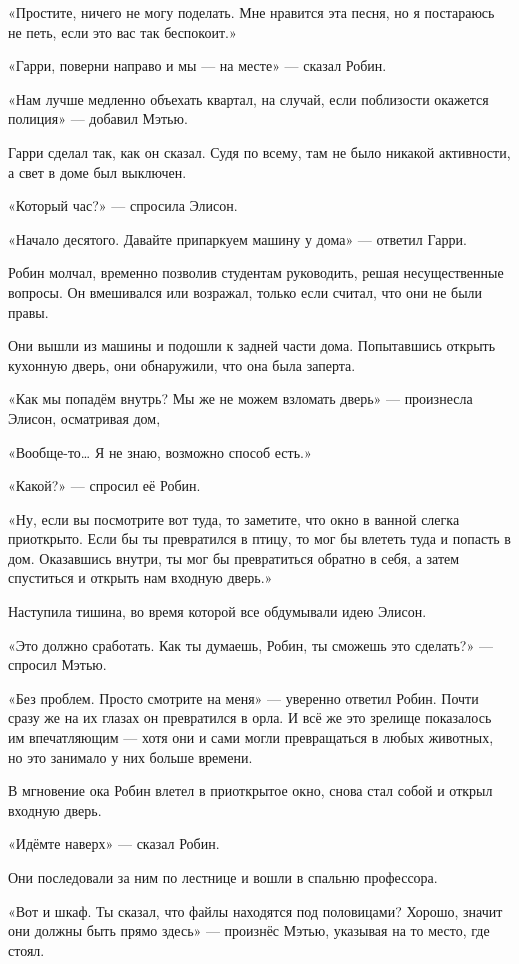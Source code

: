 \documentclass[a5paper, 9pt,
final, openany, twoside=true]{memoir}
\begin{document}
«Простите, ничего не могу поделать. Мне нравится эта песня, но я постараюсь не петь, если это вас так беспокоит.»

«Гарри, поверни направо и мы — на месте» — сказал Робин.

«Нам лучше медленно объехать квартал, на случай, если поблизости окажется полиция» — добавил Мэтью.

Гарри сделал так, как он сказал. Судя по всему, там не было никакой активности, а свет в доме был выключен.

«Который час?» — спросила Элисон.

«Начало десятого. Давайте припаркуем машину у дома» — ответил Гарри.

Робин молчал, временно позволив студентам руководить, решая несущественные вопросы. Он вмешивался или возражал, только если считал, что они не были правы.

Они вышли из машины и подошли к задней части дома. Попытавшись открыть кухонную дверь, они обнаружили, что она была заперта.

«Как мы попадём внутрь? Мы же не можем взломать дверь» — произнесла Элисон, осматривая дом,

«Вообще-то… Я не знаю, возможно способ есть.»

«Какой?» — спросил её Робин.

«Ну, если вы посмотрите вот туда, то заметите, что окно в ванной слегка приоткрыто. Если бы ты превратился в птицу, то мог бы влететь туда и попасть в дом. Оказавшись внутри, ты мог бы превратиться обратно в себя, а затем спуститься и открыть нам входную дверь.»

Наступила тишина, во время которой все обдумывали идею Элисон.

«Это должно сработать. Как ты думаешь, Робин, ты сможешь это сделать?» — спросил Мэтью.

«Без проблем. Просто смотрите на меня» — уверенно ответил Робин. Почти сразу же на их глазах он превратился в орла. И всё же это зрелище показалось им впечатляющим — хотя они и сами могли превращаться в любых животных, но это занимало у них больше времени.

В мгновение ока Робин влетел в приоткрытое окно, снова стал собой и открыл входную дверь.

«Идёмте наверх» — сказал Робин.

Они последовали за ним по лестнице и вошли в спальню профессора.

«Вот и шкаф. Ты сказал, что файлы находятся под половицами? Хорошо, значит они должны быть прямо здесь» — произнёс Мэтью, указывая на то место, где стоял.
\end{document}
